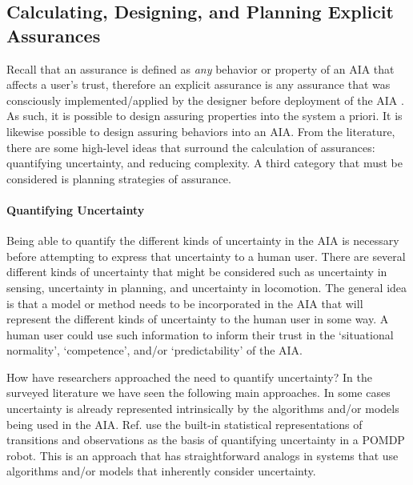 \subsection{Calculating, Designing, and Planning Explicit Assurances}
    Recall that an assurance is defined as \emph{any} behavior or property of an AIA that affects a user's trust, therefore an explicit assurance is any assurance that was consciously implemented/applied by the designer before deployment of the AIA . As such, it is possible to design assuring properties into the system a priori. It is likewise possible to design assuring behaviors into an AIA. From the literature, there are some high-level ideas that surround the calculation of assurances: quantifying uncertainty, and reducing complexity. A third category that must be considered is planning strategies of assurance.

    \paragraph{Quantifying Uncertainty} Being able to quantify the different kinds of uncertainty in the AIA is necessary before attempting to express that uncertainty to a human user. There are several different kinds of uncertainty that might be considered such as uncertainty in sensing, uncertainty in planning, and uncertainty in locomotion. The general idea is that a model or method needs to be incorporated in the AIA that will represent the different kinds of uncertainty to the human user in some way. A human user could use such information to inform their trust in the `situational normality', `competence', and/or `predictability' of the AIA. 

    How have researchers approached the need to quantify uncertainty? In the surveyed literature we have seen the following main approaches. In some cases uncertainty is already represented intrinsically by the algorithms and/or models being used in the AIA. Ref. \cite{Wang2016-id} use the built-in statistical representations of transitions and observations as the basis of quantifying uncertainty in a POMDP robot. This is an approach that has straightforward analogs in systems that use algorithms and/or models that inherently consider uncertainty.

